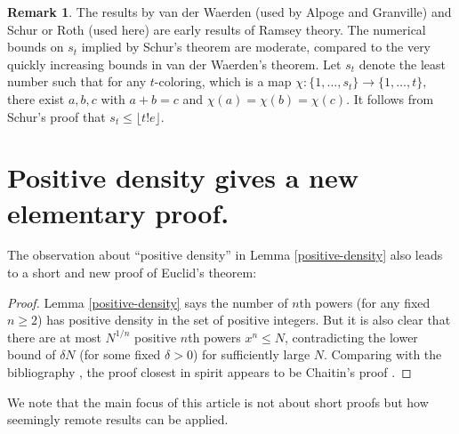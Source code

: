 \documentclass[12pt]{article}
\theoremstyle{theorem}
\theoremstyle{definition}
\newtheorem*{remark}{Remark}
\begin{document}
\begin{remark}
The results by van der Waerden (used by Alpoge and Granville) and Schur or Roth
(used here)
are early results of Ramsey theory. The numerical bounds on $s_t$ implied
by Schur's theorem are moderate, compared to the very quickly increasing
bounds in van der Waerden's theorem.
Let $s_t$ denote the least number such that for any $t$-coloring, which is a
map $\chi:\{1, \ldots , s_t\} \rightarrow \{1, \ldots , t\},$ there exist
$a,b,c$ with $a+b=c$ and $\chi(a)=\chi(b)=\chi(c)$. It follows from Schur's proof that
$s_t \leq \lfloor t!e\rfloor $.

\end{remark}

\section{Positive density gives a new elementary proof.}
{\label{sec:density}}

The observation about ``positive density'' in Lemma \ref{positive-density}
also leads to a short and new proof of Euclid's theorem:
\begin{proof}
  Lemma {\ref{positive-density}} says the number of
  $n$th powers (for any fixed $n \geq 2$)
  has positive density in the set of positive integers.
But it is also clear that there are at most
$N^{1/n}$  positive $n$th powers $x^n \leq N$,
contradicting the lower bound of $\delta N$ (for some fixed $\delta >0$)
for sufficiently large $N$. Comparing with
the bibliography \cite{Mestrovic}, the proof closest in spirit
appears to be Chaitin's proof \cite{Chaitin}.
\end{proof}
We note that the main focus of this article is not about short proofs 
but how seemingly remote results can be applied.
\end{document}
